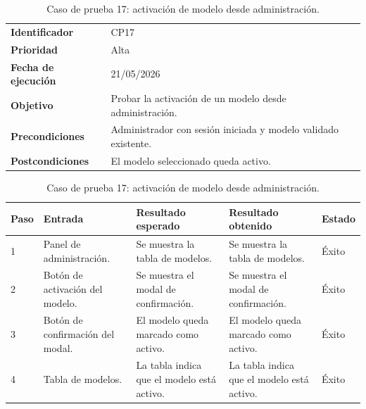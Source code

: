 \begin{table}[]
	\centering
	\footnotesize
	\renewcommand{\arraystretch}{1.2}
	\begin{tabularx}{\textwidth}{p{3.2cm} X}
		\toprule
		\textbf{Identificador} & CP17 \\
		\textbf{Prioridad} & Alta \\
		\textbf{Fecha de ejecución} & 21/05/2026 \\
		\textbf{Objetivo} & Probar la activación de un modelo desde administración. \\
		\textbf{Precondiciones} & Administrador con sesión iniciada y modelo validado existente. \\
		\textbf{Postcondiciones} & El modelo seleccionado queda activo. \\
		\midrule
	\end{tabularx}
	\begin{tabularx}{\textwidth}{p{0.8cm} p{3.2cm} X X p{1.3cm}}
		\textbf{Paso} & \textbf{Entrada} & \textbf{Resultado esperado} & \textbf{Resultado obtenido} & \textbf{Estado} \\
		\midrule
		1 & Panel de administración. & Se muestra la tabla de modelos. & Se muestra la tabla de modelos. & Éxito \\
		2 & Botón de activación del modelo. & Se muestra el modal de confirmación. & Se muestra el modal de confirmación. & Éxito \\
		3 & Botón de confirmación del modal. & El modelo queda marcado como activo. & El modelo queda marcado como activo. & Éxito \\
		4 & Tabla de modelos. & La tabla indica que el modelo está activo. & La tabla indica que el modelo está activo. & Éxito \\
		\bottomrule
	\end{tabularx}
	\caption{Caso de prueba 17: activación de modelo desde administración.}
	\label{tab:cp17}
\end{table}
